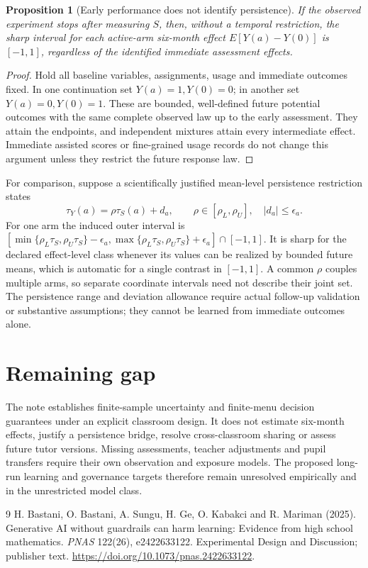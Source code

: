 \documentclass[11pt]{article}
\newtheorem{proposition}[theorem]{Proposition}
\theoremstyle{remark}
\begin{document}
\begin{proposition}[Early performance does not identify persistence]
If the observed experiment stops after measuring $S$, then, without a temporal restriction, the sharp interval for each active-arm six-month effect $E[Y(a)-Y(0)]$ is $[-1,1]$, regardless of the identified immediate assessment effects.
\end{proposition}
\begin{proof}
Hold all baseline variables, assignments, usage and immediate outcomes fixed. In one continuation set $Y(a)=1,Y(0)=0$; in another set $Y(a)=0,Y(0)=1$. These are bounded, well-defined future potential outcomes with the same complete observed law up to the early assessment. They attain the endpoints, and independent mixtures attain every intermediate effect. Immediate assisted scores or fine-grained usage records do not change this argument unless they restrict the future response law.
\end{proof}
For comparison, suppose a scientifically justified mean-level persistence restriction states
\[
 \tau_Y(a)=\rho\tau_S(a)+d_a,\qquad
 \rho\in[\rho_L,\rho_U],\quad |d_a|\le\epsilon_a.
\]
For one arm the induced outer interval is
$[\min\{\rho_L\tau_S,\rho_U\tau_S\}-\epsilon_a,
\max\{\rho_L\tau_S,\rho_U\tau_S\}+\epsilon_a]\cap[-1,1]$.
It is sharp for the declared effect-level class whenever its values can be realized by bounded future means, which is automatic for a single contrast in $[-1,1]$. A common $\rho$ couples multiple arms, so separate coordinate intervals need not describe their joint set. The persistence range and deviation allowance require actual follow-up validation or substantive assumptions; they cannot be learned from immediate outcomes alone.

\section*{Remaining gap}
The note establishes finite-sample uncertainty and finite-menu decision guarantees under an explicit classroom design. It does not estimate six-month effects, justify a persistence bridge, resolve cross-classroom sharing or assess future tutor versions. Missing assessments, teacher adjustments and pupil transfers require their own observation and exposure models. The proposed long-run learning and governance targets therefore remain unresolved empirically and in the unrestricted model class.

\begin{thebibliography}{9}
 H. Bastani, O. Bastani, A. Sungu, H. Ge, O. Kabakci and R. Mariman (2025). Generative AI without guardrails can harm learning: Evidence from high school mathematics. \emph{PNAS} 122(26), e2422633122. Experimental Design and Discussion; publisher text. \url{https://doi.org/10.1073/pnas.2422633122}.
\end{thebibliography}
\end{document}

